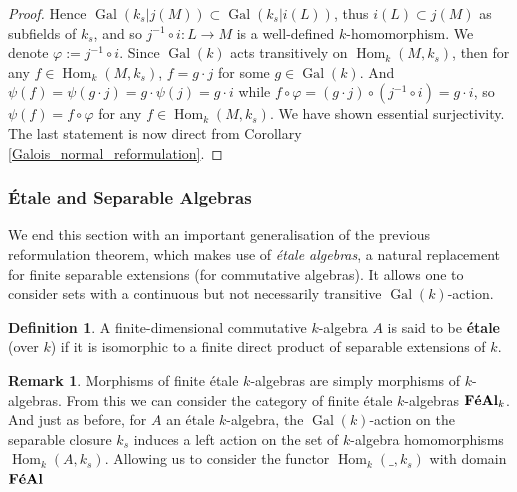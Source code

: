 \documentclass{article}
\theoremstyle{plain}
\theoremstyle{definition}
\newtheorem{definition}[theorem]{Definition}
\newtheorem{remark}{Remark}
\DeclareMathOperator{\Hom}{Hom}
\DeclareMathOperator{\Gal}{Gal}
\DeclareMathOperator{\FeAl}{\bf{F\acute{e}Al}}
\begin{document}
\begin{proof}
    Hence $\Gal(k_s| j(M)) \subset \Gal(k_s|i(L))$, thus $i(L)\subset j(M)$ as subfields of $k_s$, and so $j^{-1}\circ i:L\rightarrow M$ is a well-defined $k$-homomorphism. We denote $\varphi:=j^{-1}\circ i$.
    Since $\Gal(k)$ acts transitively on $\Hom_k(M,k_s)$, then for any $f\in\Hom_k(M,k_s)$, $f = g\cdot j$ for some $g\in\Gal(k)$.
    And $\psi(f) = \psi(g\cdot j) = g\cdot \psi(j) = g\cdot i$ while $f\circ \varphi = (g\cdot j) \circ (j^{-1}\circ i) = g\cdot i$, so $\psi(f) = f\circ \varphi$ for any $f\in\Hom_k(M,k_s)$. We have shown essential surjectivity.\\
    The last statement is now direct from Corollary \ref{Galois_normal_reformulation}.
    
    
    
    

\end{proof}


\subsubsection{\'Etale and Separable Algebras}

We end this section with an important generalisation of the previous reformulation theorem, 
which makes use of \textit{\'etale algebras}, a natural replacement for finite separable extensions (for commutative algebras). 
It allows one to consider sets with a continuous but not necessarily transitive $\Gal(k)$-action.

\begin{definition}
    A finite-dimensional commutative $k$-algebra $A$ is said to be \textbf{\'etale} (over $k$) if it is isomorphic to a finite direct product of separable extensions of $k$.
\end{definition}

\begin{remark}
    Morphisms of finite \'etale $k$-algebras are simply morphisms of $k$-algebras. From this we can consider the category of finite \'etale $k$-algebras $\FeAl_k$.
    And just as before, for $A$ an \'etale $k$-algebra, the $\Gal(k)$-action on the separable closure $k_s$ induces a left action on the set of $k$-algebra homomorphisms $\Hom_k(A,k_s)$. Allowing us to consider the functor $\Hom_k(\_,k_s)$ with domain $\FeAl$ 
\end{remark}
\end{document}

